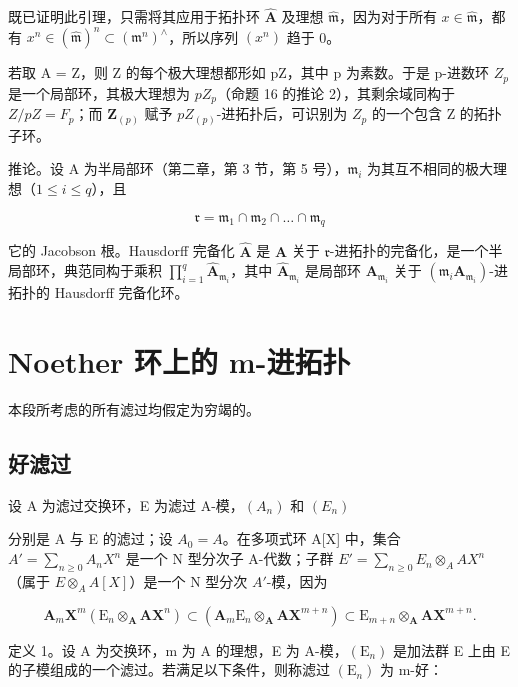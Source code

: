 既已证明此引理，只需将其应用于拓扑环 \(\hat{\mathbf{A}}\) 及理想 \(\hat{\mathfrak{m}}\)，因为对于所有 \(x \in \hat{\mathfrak{m}}\)，都有 \(x^n \in (\hat{\mathfrak{m}})^n \subset (\mathfrak{m}^n)^\wedge\)，所以序列 \((x^n)\) 趋于 0。

若取 A = Z，则 Z 的每个极大理想都形如 pZ，其中 p 为素数。于是 p-进数环 \(Z_{p}\) 是一个局部环，其极大理想为 \(pZ_{p}\)（命题 16 的推论 2），其剩余域同构于 \(Z/pZ = F_{p}\)；而 \(\mathbf{Z}_{(p)}\) 赋予 \(pZ_{(p)}\)-进拓扑后，可识别为 \(Z_{p}\) 的一个包含 Z 的拓扑子环。

推论。设 A 为半局部环（第二章，第 3 节，第 5 号），\(\mathfrak{m}_i\) 为其互不相同的极大理想（\(1 \leqslant i \leqslant q\)），且

\[
\mathfrak {r} = \mathfrak {m} _ {1} \cap \mathfrak {m} _ {2} \cap \dots \cap \mathfrak {m} _ {q}
\]

它的 Jacobson 根。Hausdorff 完备化 \(\hat{\mathbf{A}}\) 是 \(\mathbf{A}\) 关于 \(\mathfrak{r}\)-进拓扑的完备化，是一个半局部环，典范同构于乘积 \(\prod_{i=1}^{q} \hat{\mathbf{A}}_{\mathfrak{m}_i}\)，其中 \(\hat{\mathbf{A}}_{\mathfrak{m}_i}\) 是局部环 \(\mathbf{A}_{\mathfrak{m}_i}\) 关于 \((\mathfrak{m}_i\mathbf{A}_{\mathfrak{m}_i})\)-进拓扑的 Hausdorff 完备化环。

\section{Noether 环上的 m-进拓扑}

本段所考虑的所有滤过均假定为穷竭的。

\subsection{好滤过}

设 A 为滤过交换环，E 为滤过 A-模，\((A_{n})\) 和 \((E_{n})\)

分别是 A 与 E 的滤过；设 \(A_{0} = A\)。在多项式环 A{[}X{]} 中，集合 \(A' = \sum_{n \geqslant 0} A_{n} X^{n}\) 是一个 N 型分次子 A-代数；子群 \(E' = \sum_{n \geqslant 0} E_{n} \otimes_{A} A X^{n}\)（属于 \(E \otimes_{A} A[X]\)）是一个 N 型分次 \(A'\)-模，因为

\[
\mathbf {A} _ {m} \mathbf {X} ^ {m} (\mathrm{E} _ {n} \otimes_ {\mathbf {A}} \mathbf {A X} ^ {n}) \subset (\mathbf {A} _ {m} \mathrm{E} _ {n} \otimes_ {\mathbf {A}} \mathbf {A X} ^ {m + n}) \subset \mathrm{E} _ {m + n} \otimes_ {\mathbf {A}} \mathbf {A X} ^ {m + n}.
\]

定义 1。设 A 为交换环，m 为 A 的理想，E 为 A-模，\((\mathrm{E}_{n})\) 是加法群 E 上由 E 的子模组成的一个滤过。若满足以下条件，则称滤过 \((\mathrm{E}_{n})\) 为 m-好：

